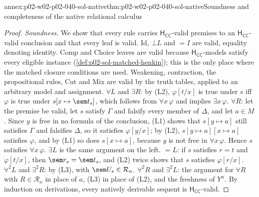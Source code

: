 \begin{annexitem}{annex:p02-w02-p02-040-sol-native}{thm:p02-w02-p02-040-sol-native}{Soundness and completeness of the native relational calculus}
\begin{proof}
\emph{Soundness.}  We show that every rule carries
\(\mathsf H_{\mathsf{CC}}\)-valid premises to an \(\mathsf H_{\mathsf{CC}}\)-valid
conclusion and that every leaf is valid.  Id, \(\bot L\) and \({=}I\) are
valid, equality denoting identity.  Comp and Choice leaves are valid because
\(\mathsf H_{\mathsf{CC}}\)-models satisfy every eligible instance
(\cref{def:p02-sol-matched-henkin}); this is the only place where the
matched closure conditions are used.  Weakening, contraction, the
propositional rules, Cut and Mix are valid by the truth tables, applied to an
arbitrary model and assignment.  \(\forall L\) and \(\exists R\): by (L2),
\(\varphi[t/x]\) is true under \(s\) iff \(\varphi\) is true under
\(s[x\mapsto\sem t_s]\), which follows from \(\forall x\,\varphi\) and implies
\(\exists x\,\varphi\).  \(\forall R\): let the premise be valid, let \(s\)
satisfy \(\Gamma\) and falsify every member of \(\Delta\), and let \(a\in M\).
Since \(y\) is free in no formula of the conclusion, (L1) shows that
\(s[y\mapsto a]\) still satisfies \(\Gamma\) and falsifies \(\Delta\), so it
satisfies \(\varphi[y/x]\); by (L2), \(s[y\mapsto a][x\mapsto a]\) satisfies
\(\varphi\), and by (L1) so does \(s[x\mapsto a]\), because \(y\) is not free in
\(\forall x\,\varphi\).  Hence \(s\) satisfies \(\forall x\,\varphi\).
\(\exists L\) is the same argument on the left.  \({=}L\): if \(s\) satisfies
\(r=t\) and \(\varphi[t/x]\), then \(\sem r_s=\sem t_s\), and (L2) twice shows
that \(s\) satisfies \(\varphi[r/x]\).  \(\forall^2L\) and \(\exists^2R\): by
(L3), with \(\sem U_s\in\mathcal R_n\).  \(\forall^2R\) and \(\exists^2L\): the
argument for \(\forall R\) with \(R\in\mathcal R_n\) in place of \(a\), (L3) in
place of (L2), and the freshness of \(Y^n\).  By induction on derivations,
every natively derivable sequent is \(\mathsf H_{\mathsf{CC}}\)-valid.


\end{proof}
\end{annexitem}
